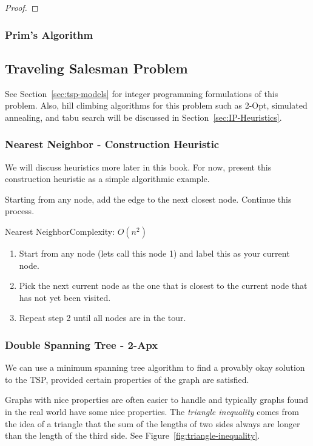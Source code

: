 \begin{proof}
%
\end{proof}

\subsubsection{Prim's Algorithm}

\subsection{Traveling Salesman Problem}

See Section~\ref{sec:tsp-models} for integer programming formulations of this problem.  Also, hill climbing algorithms for this problem such as 2-Opt, simulated annealing, and tabu search will be discussed in Section~\ref{sec:IP-Heuristics}.

\subsubsection{Nearest Neighbor - Construction Heuristic}

We will discuss heuristics more later in this book.   For now, present this construction heuristic as a simple algorithmic example.   

Starting from any node, add the edge to the next closest node.  Continue this process.
\begin{general}{Nearest Neighbor}{Complexity: $O(n^2)$}
\label{heuristic:nearestNeighbor}
\begin{enumerate}
\item Start from any node (lets call this node 1) and label this as your current node.
\item Pick the next current node as the one that is closest to the current node that has not yet been visited.
\item Repeat step 2 until all nodes are in the tour.
\end{enumerate}
\end{general}

\subsubsection{Double Spanning Tree - 2-Apx}
We can use a minimum spanning tree algorithm to find a provably okay solution to the TSP, provided certain properties of the graph are satisfied.  

Graphs with nice properties are often easier to handle and typically graphs found in the real world have some nice properties. The \emph{triangle inequality} comes from the idea of a triangle that the sum of the lengths of two sides always are longer than the length of the third side. See Figure~\ref{fig:triangle-inequality}.

